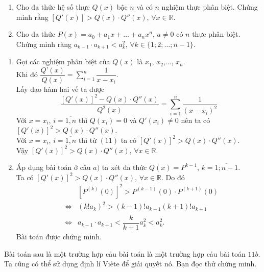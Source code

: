 \begin{bt}%
	\hfill
	\begin{enumerate}
		\item Cho đa thức hệ số thực $Q(x)$ bậc $n$ và có $n$ nghiệm thực phân biệt. Chứng minh rằng 
		$\left[Q'(x)\right]>Q(x)\cdot Q''(x)$, $\forall x\in \mathbb{R}$.
		\item Cho đa thức $P(x)=a_0+a_1x+\ldots+a_nx^n$, $a\ne 0$ có $n$ thực phân biệt. Chứng minh răng $a_{k-1}\cdot a_{k+1}<a_k^2$, $\forall k\in\{1;2;\ldots;n-1\}$.
	\end{enumerate}
	\begin{cm}
		\begin{enumerate}
			\item Gọi các nghiệm phân biệt của $Q(x)$ là $x_1$, $x_2$,$\ldots$, $x_n$.\\ Khi đó $\dfrac{Q’(x)}{Q(x)}= \displaystyle\sum\limits_{i=1}^n\dfrac{1}{x-x_i}$.\\
			Lấy đạo hàm hai vế ta được
			\[\dfrac{\left[Q'(x)\right]^2-Q(x)\cdot Q''(x)}{Q^2(x)}=\displaystyle\sum\limits_{i=1}^n\dfrac{1}{(x-x_i)^2}\tag{11}\]
			Với $x=x_i$, $i=\overline{1,n}$ thì $Q(x_i)=0$ và $Q'(x_i)\ne 0$ nên ta có $\left[Q'(x)\right]^2>Q(x)\cdot Q''(x)$.\\
			Với $x=x_i$, $i=\overline{1,n}$ thì từ $(11)$ ta có $\left[Q'(x)\right]^2>Q(x)\cdot Q''(x)$.\\
			Vậy $\left[Q'(x)\right]^2>Q(x)\cdot Q''(x)$, $\forall x \in \mathbb{R}$.
			\item Áp dụng bài toán ở câu $a)$ ta xét đa thức $Q(x)=P^{k-1}$, $k=\overline{1;n-1}$.\\
			Ta có $\left[Q'(x)\right]^2>Q(x)\cdot Q''(x)$, $\forall x\in \mathbb{R}$. Do đó
			\begin{eqnarray*}
				& & \left[P^{(k)}(0)\right]^2>P^{(k-1)}(0)\cdot P^{(k+1)}(0)\\
				& \Leftrightarrow & \left(k!a_k\right)^2>(k-1)!a_{k-1}(k+1)!a_{k+1}\\
				& \Leftrightarrow & a_{k-1} \cdot a_{k+1} <\dfrac{k}{k+1}a_k^2<a_k^2.
			\end{eqnarray*}
			Bài toán được chứng minh.
		\end{enumerate}
	\end{cm}
\end{bt}

\begin{nx}
	Bài toán sau là một trường hợp cảu bài toán là một trường hợp cảu bài toán $11b$. Ta cũng có thể sử dụng định lí Viète để giải quyết nó. Bạn đọc thử chứng minh.
\end{nx}

